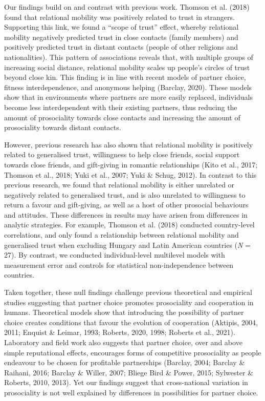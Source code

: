 \documentclass[
  man,floatsintext]{apa6}
\begin{document}
Our findings build on and contrast with previous work. Thomson et al. (2018) found that relational mobility was positively related to trust in strangers. Supporting this link, we found a ``scope of trust'' effect, whereby relational mobility negatively predicted trust in close contacts (family members) and positively predicted trust in distant contacts (people of other religions and nationalities). This pattern of associations reveals that, with multiple groups of increasing social distance, relational mobility scales up people's circles of trust beyond close kin. This finding is in line with recent models of partner choice, fitness interdependence, and anonymous helping (Barclay, 2020). These models show that in environments where partners are more easily replaced, individuals become less interdependent with their existing partners, thus reducing the amount of prosociality towards close contacts and increasing the amount of prosociality towards distant contacts.

However, previous research has also shown that relational mobility is positively related to generalised trust, willingness to help close friends, social support towards close friends, and gift-giving in romantic relationships (Kito et al., 2017; Thomson et al., 2018; Yuki et al., 2007; Yuki \& Schug, 2012). In contrast to this previous research, we found that relational mobility is either unrelated or negatively related to generalised trust, and is also unrelated to willingness to return a favour and gift-giving, as well as a host of other prosocial behaviours and attitudes. These differences in results may have arisen from differences in analytic strategies. For example, Thomson et al. (2018) conducted country-level correlations, and only found a relationship between relational mobility and generalised trust when excluding Hungary and Latin American countries (\emph{N} = 27). By contrast, we conducted individual-level multilevel models with measurement error and controls for statistical non-independence between countries.

Taken together, these null findings challenge previous theoretical and empirical studies suggesting that partner choice promotes prosociality and cooperation in humans. Theoretical models show that introducing the possibility of partner choice creates conditions that favour the evolution of cooperation (Aktipis, 2004, 2011; Enquist \& Leimar, 1993; Roberts, 2020, 1998; Roberts et al., 2021). Laboratory and field work also suggests that partner choice, over and above simple reputational effects, encourages forms of competitive prosociality as people endeavour to be chosen for profitable partnerships (Barclay, 2004; Barclay \& Raihani, 2016; Barclay \& Willer, 2007; Bliege Bird \& Power, 2015; Sylwester \& Roberts, 2010, 2013). Yet our findings suggest that cross-national variation in prosociality is not well explained by differences in possibilities for partner choice.
\end{document}

